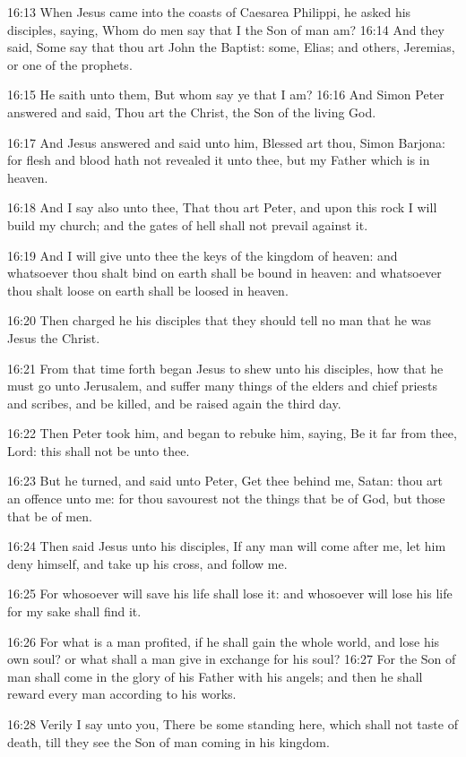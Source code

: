 16:13 When Jesus came into the coasts of Caesarea Philippi, he asked his disciples, saying, Whom do men say that I the Son of man am?  16:14 And they said, Some say that thou art John the Baptist: some, Elias; and others, Jeremias, or one of the prophets.

16:15 He saith unto them, But whom say ye that I am?  16:16 And Simon Peter answered and said, Thou art the Christ, the Son of the living God.

16:17 And Jesus answered and said unto him, Blessed art thou, Simon Barjona: for flesh and blood hath not revealed it unto thee, but my Father which is in heaven.

16:18 And I say also unto thee, That thou art Peter, and upon this rock I will build my church; and the gates of hell shall not prevail against it.

16:19 And I will give unto thee the keys of the kingdom of heaven: and whatsoever thou shalt bind on earth shall be bound in heaven: and whatsoever thou shalt loose on earth shall be loosed in heaven.

16:20 Then charged he his disciples that they should tell no man that he was Jesus the Christ.

16:21 From that time forth began Jesus to shew unto his disciples, how that he must go unto Jerusalem, and suffer many things of the elders and chief priests and scribes, and be killed, and be raised again the third day.

16:22 Then Peter took him, and began to rebuke him, saying, Be it far from thee, Lord: this shall not be unto thee.

16:23 But he turned, and said unto Peter, Get thee behind me, Satan: thou art an offence unto me: for thou savourest not the things that be of God, but those that be of men.

16:24 Then said Jesus unto his disciples, If any man will come after me, let him deny himself, and take up his cross, and follow me.

16:25 For whosoever will save his life shall lose it: and whosoever will lose his life for my sake shall find it.

16:26 For what is a man profited, if he shall gain the whole world, and lose his own soul? or what shall a man give in exchange for his soul?  16:27 For the Son of man shall come in the glory of his Father with his angels; and then he shall reward every man according to his works.

16:28 Verily I say unto you, There be some standing here, which shall not taste of death, till they see the Son of man coming in his kingdom.

